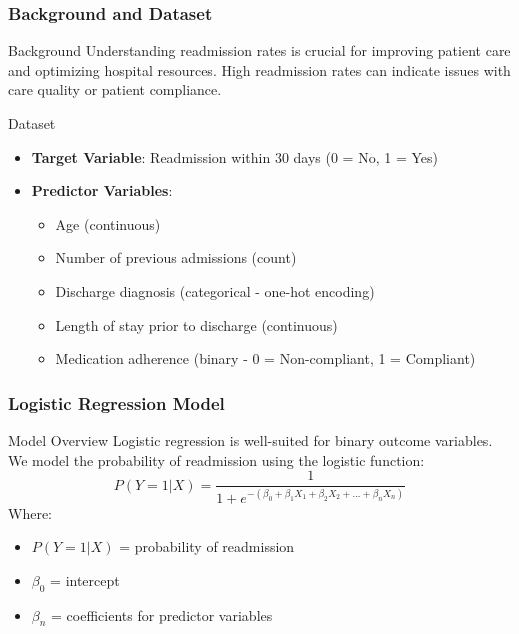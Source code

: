 \documentclass[aspectratio=169]{beamer}
\begin{document}
\begin{frame}[fragile]
    \frametitle{Background and Dataset}
    \begin{block}{Background}
        Understanding readmission rates is crucial for improving patient care and optimizing hospital resources. 
        High readmission rates can indicate issues with care quality or patient compliance.
    \end{block}
    
    \begin{block}{Dataset}
        \begin{itemize}
            \item \textbf{Target Variable}: Readmission within 30 days (0 = No, 1 = Yes)
            \item \textbf{Predictor Variables}:
                \begin{itemize}
                    \item Age (continuous)
                    \item Number of previous admissions (count)
                    \item Discharge diagnosis (categorical - one-hot encoding)
                    \item Length of stay prior to discharge (continuous)
                    \item Medication adherence (binary - 0 = Non-compliant, 1 = Compliant)
                \end{itemize}
        \end{itemize}
    \end{block}
\end{frame}

\begin{frame}[fragile]
    \frametitle{Logistic Regression Model}
    \begin{block}{Model Overview}
        Logistic regression is well-suited for binary outcome variables. 
        We model the probability of readmission using the logistic function:
        \begin{equation}
            P(Y=1 | X) = \frac{1}{1 + e^{- (β_0 + β_1X_1 + β_2X_2 + ... + β_nX_n)}}
        \end{equation}
        Where:
        \begin{itemize}
            \item $P(Y=1 | X)$ = probability of readmission
            \item $β_0$ = intercept
            \item $β_n$ = coefficients for predictor variables
        \end{itemize}
    \end{block}
\end{frame}
\end{document}

